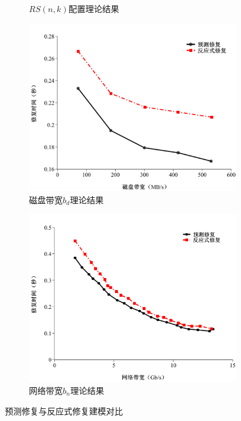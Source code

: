 \begin{figure}[htbp]
\begin{subfigure}[t]{0.4\textwidth}
		\caption{$RS(n,k)$配置理论结果}
		\label{fig:3-2}
	\end{subfigure}
	\begin{subfigure}[t]{0.4\textwidth}
		\centering
		\includegraphics[width=1.1\linewidth]{figures/3-3.pdf}
		\caption{磁盘带宽$b_d$理论结果}
		\label{fig:3-3}
	\end{subfigure}
	\begin{subfigure}[t]{0.4\textwidth}
		\centering
		\includegraphics[width=1.1\linewidth]{figures/3-4.pdf}
		\caption{网络带宽$b_n$理论结果}
		\label{fig:3-4}
	\end{subfigure}
	\caption{预测修复与反应式修复建模对比}
	\label{fig:3.1}
\end{figure}


